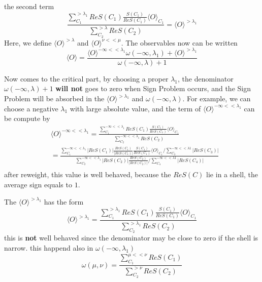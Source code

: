 \documentclass{article}
\begin{document}
    the second term
    \begin{equation}
        \frac{\sum^{>\lambda_{1}}_{C_{1}} ReS(C_{1}) \frac{S(C_{1})}{ReS(C_{1})} \langle O \rangle_{C_{1}}}{\sum^{>\lambda}_{C_{2}} ReS(C_{2})} = \langle O \rangle^{>\lambda_{1}}
    \end{equation}
    Here, we define $\langle O \rangle^{>\lambda}$ and $\langle O \rangle^{\nu<<\mu}$.
    The observables now can be written
    \begin{equation}
    \boxed{
        \langle O \rangle = \frac{\langle O \rangle^{-\infty<<\lambda_{1}} \omega(-\infty, \lambda_{1}) + \langle O \rangle^{>\lambda_{1}}}{\omega(-\infty,\lambda) + 1}
    }
    \end{equation}
    
    Now comes to the critical part, by choosing a proper $\lambda_{1}$,
    the denominator $\omega(-\infty,\lambda) + 1$ \textbf{will not} goes to zero when Sign Problem occurs,
    and the Sign Problem will be absorbed in the $\langle O \rangle^{>\lambda_{1}}$ and $\omega(-\infty,\lambda)$.
    For example, we can choose a negative $\lambda_{1}$ with large absolute value, 
    and the term of $\langle O \rangle^{-\infty<<\lambda_{1}}$ can be compute by
    \begin{equation}
        \begin{aligned}
            &\langle O \rangle^{-\infty<<\lambda_{1}} = \frac{\sum^{-\infty<<\lambda_{1}}_{C_{1}} ReS(C_{1})  \frac{S(C_{1})}{ReS(C_{1})} \langle O \rangle_{C_{1}} }{\sum^{-\infty<<\lambda_{1}}_{C_{2}} ReS(C_{2})}\\
            &=\frac{\sum^{-\infty<<\lambda_{1}}_{C_{1}} \vert ReS(C_{1}) \vert \frac{ReS(C_{1})}{\vert ReS(C_{1}) \vert} \frac{S(C_{1})}{ReS(C_{1})} \langle O \rangle_{C_{1}} / \sum^{-\infty<<\lambda1}_{C_{3}} \vert ReS(C_{3}) \vert }{\sum^{-\infty<<\lambda_{1}}_{C_{2}} \vert ReS(C_{2}) \vert \frac{ReS(C_{2})}{\vert ReS(C_{2}) \vert} / \sum^{-\infty<<\lambda1}_{C_{4}} \vert ReS(C_{4}) \vert}\\
        \end{aligned}
    \end{equation}
    after reweight, this value is well behaved, because the $ReS(C)$ lie in a shell, the average sign equals to $1$.

    The $\langle O \rangle^{>\lambda_{1}}$ has the form
    \begin{equation}
        \langle O \rangle^{>\lambda_{1}} = \frac{\sum^{>\lambda_{1}}_{C_{1}} ReS(C_{1}) \frac{S(C_{1})}{ReS(C_{1})} \langle O \rangle_{C_{1}}}{\sum^{>\lambda_{1}}_{C_{2}} ReS(C_{2})}
    \end{equation}
    this is \textbf{not} well behaved since the denominator may be close to zero if the shell is narrow.
    this happend also in $\omega(-\infty, \lambda_{1})$
    \begin{equation}
        \omega(\mu,\nu) = \frac{\sum^{\mu<<\nu}_{C_{1}} ReS(C_{1})}{\sum^{>\nu}_{C_{2}} ReS(C_{2})}
    \end{equation}
\end{document}
